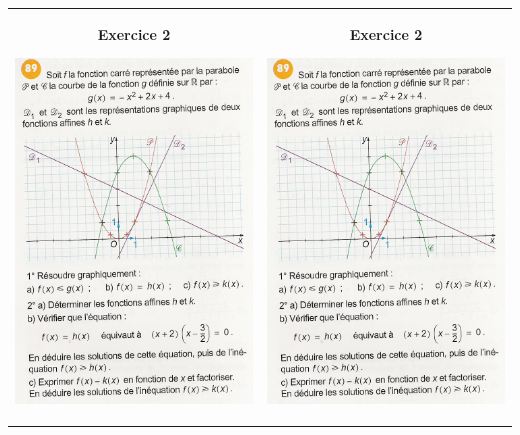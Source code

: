 \documentclass[12pt, twoside]{article}
\begin{document}
\medskip

\begin{tabular}{cc}
\begin{minipage}{9cm}
\textbf{Exercice 2}

\enskip

\includegraphics[width=8cm]{images/ineq1.png}
\end{minipage}
&
\begin{minipage}{9cm}
\textbf{Exercice 2}

\enskip

\includegraphics[width=8cm]{images/ineq1.png}
\end{minipage}
\end{tabular}
\end{document}

